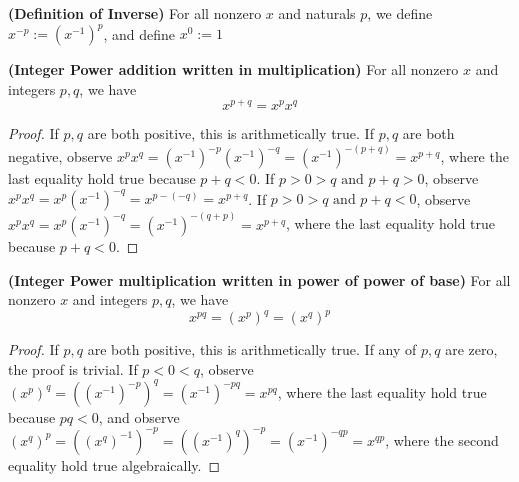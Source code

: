\documentclass{report}
\begin{document}
\begin{definition}
\textbf{(Definition of Inverse)} For all nonzero $x$ and naturals $p$, we define $x^{-p}:=(x^{-1})^p$, and define $x^0:=1$ 
\end{definition}
\begin{theorem}
 \textbf{(Integer Power addition written in multiplication)} For all nonzero $x$ and integers $p,q$, we have 
 \begin{equation}
x^{p+q}=x^px^{q}
\end{equation}
\end{theorem}
\begin{proof}
  If $p,q$ are both positive, this is arithmetically true. If $p,q$ are both negative, observe $x^px^q=(x^{-1})^{-p}(x^{-1})^{-q}=(x^{-1})^{-(p+q)}=x^{p+q}$, where the last equality hold true because $p+q<0$. If $p>0>q\text{ and }p+q>0$, observe $x^px^q=x^p(x^{-1})^{-q}=x^{p-(-q)}=x^{p+q}$. If $p>0>q\text{ and }p+q<0$, observe $x^px^q=x^p(x^{-1})^{-q}=(x^{-1})^{-(q+p)}=x^{p+q}$, where the last equality hold true because $p+q<0.$ 
\end{proof}
\begin{theorem}
\textbf{(Integer Power multiplication written in power of power of base)} For all nonzero $x$ and integers $p,q$, we have
\begin{equation}
  x^{pq}=(x^p)^q=(x^q)^p
\end{equation}
\end{theorem}
\begin{proof}
  If $p,q$ are both positive, this is arithmetically true. If any of $p,q$ are zero, the proof is trivial. If $p<0<q$, observe $(x^p)^q=((x^{-1})^{-p})^q=(x^{-1})^{-pq}=x^{pq}$, where the last equality hold true because $pq<0$, and observe $(x^q)^p=((x^q)^{-1})^{-p}=((x^{-1})^{q})^{-p}=(x^{-1})^{-qp}=x^{qp}$, where the second equality hold true algebraically.    
\end{proof}
\end{document}
